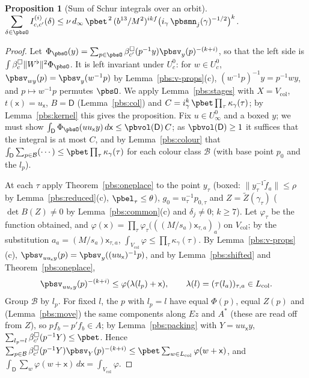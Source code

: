 \documentclass[10pt]{amsart}
\newtheorem{proposition}[theorem]{Proposition}
\theoremstyle{definition}
\theoremstyle{remark}
\begin{document}
\begin{proposition}[Sum of Schur integrals over an orbit]\label{pbs:orbit-sum}
$\displaystyle\sum_{\delta\in\pbsO}I^{(i)}_{c,c'}(\delta)\le\nu\,d_\infty\,\pbet^{\,2}\,(b^{13}/M^2)^{ikf}
\bigl(i_\gamma\,\pbsmn_j(\gamma)^{-1/2}\bigr)^k$.
\end{proposition}
\begin{proof}
Let $\Phi_\pbsO(y)=\sum_{p\in\pbsO}\beta^\square_{c'}(p^{-1}y)\pbsv_y(p)^{-(k+i)}$, so that the left side is
$\int\beta^\square_c\|W^\flat\|^2\Phi_\pbsO$. It is left invariant under $U^0_c$: for $w\in U^0_c$,
$\pbsv_{wy}(p)=\pbsv_y(w^{-1}p)$ by Lemma~\ref{pbs:v-props}(c), $(w^{-1}p)^{-1}y=p^{-1}wy$, and $p\mapsto
w^{-1}p$ permutes $\pbsO$. We apply Lemma~\ref{pbs:stages} with $X=V_{\mathrm{col}}$, $t(\mathsf x)=u_{
\mathsf x}$, $B=\mathsf D$ (Lemma~\ref{pbs:col}) and $C=i_\gamma^k\,\pbet\prod_\tau\kappa_\gamma(\tau)$; by
Lemma~\ref{pbs:kernel} this gives the proposition. Fix $u\in U^0_\infty$ and a boxed $y$; we must show
$\int_{\mathsf D}\Phi_\pbsO(uu_{\mathsf x}y)\,d\mathsf x\le\pbvol(\mathsf D)\,C$; as $\pbvol(\mathsf D)\ge1$ it
suffices that the integral is at most $C$, and by Lemma~\ref{pbs:colour} that $\int_{\mathsf D}\sum_{p\in
\mathcal B}(\cdots)\le\pbet\prod_\tau\kappa_\gamma(\tau)$ for each colour class $\mathcal B$ (with base point
$p_0$ and the $l_p$).

At each $\tau$ apply Theorem~\ref{pbs:oneplace} to the point $y_\tau$ (boxed: $\|y_\tau^{-1}\tilde f_a\|\le
\rho$ by Lemma~\ref{pbs:reduced}(c), $\pbel_\tau\le\theta$), $g_0=u_\tau^{-1}p_{0,\tau}$ and $Z=\tilde Z(
\gamma_\tau)$ ($\det B(Z)\ne0$ by Lemma~\ref{pbs:common}(c) and $\delta_j\ne0$; $k\ge7$). Let $\varphi_\tau$ be
the function obtained, and $\varphi(\mathsf x)=\prod_\tau\varphi_\tau\bigl(((M/s_a)\mathsf x_{\tau,a})_a\bigr)$
on $V_{\mathrm{col}}$; by the substitution $a_a=(M/s_a)\mathsf x_{\tau,a}$, $\int_{V_{\mathrm{col}}}\varphi\le
\prod_\tau\kappa_\gamma(\tau)$. By Lemma~\ref{pbs:v-props}(c), $\pbsv_{uu_{\mathsf x}y}(p)=\pbsv_y((uu_{\mathsf
x})^{-1}p)$, and by Lemma~\ref{pbs:shifted} and Theorem~\ref{pbs:oneplace},
\[
\pbsv_{uu_{\mathsf x}y}(p)^{-(k+i)}\le\varphi(\lambda(l_p)+\mathsf x),\qquad\lambda(l)=(\tau(l_a))_{\tau,a}
\in L_{\mathrm{col}} .
\]
Group $\mathcal B$ by $l_p$. For fixed $l$, the $p$ with $l_p=l$ have equal $\Phi(p)$, equal $Z(p)$ and
(Lemma~\ref{pbs:move}) the same components along $Ez$ and $A^*$ (these are read off from $Z$), so
$pf_b-p'f_b\in A$; by Lemma~\ref{pbs:packing} with $Y=uu_{\mathsf x}y$, $\sum_{l_p=l}\beta^\square_{c'}(p^{-1}
Y)\le\pbet$. Hence $\sum_{p\in\mathcal B}\beta^\square_{c'}(p^{-1}Y)\pbsv_Y(p)^{-(k+i)}\le\pbet\sum_{w\in
L_{\mathrm{col}}}\varphi(w+\mathsf x)$, and $\int_{\mathsf D}\sum_w\varphi(w+\mathsf x)\,d\mathsf x=\int_{V_{
\mathrm{col}}}\varphi$.
\end{proof}
\end{document}
